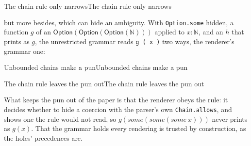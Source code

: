 \documentclass[acmsmall,screen,review,anonymous,nonacm]{acmart}
\begin{document}
\begin{leantheorem}[sum=1xNECGJZ4f]{The chain rule only narrows}{The chain rule only narrows}
\label{thm:The-chain-rule-only-narrows}
\LeanProse{Let $\mathcal{S} \in \texttt{Sorts}$, $G \in \texttt{Grammar}$, $\mathit{ts} \in \mathsf{Array}(\mathit{String})$, $s \in \mathit{String}$, $\mathit{prec} \in \mathbb{N}$, $\mathit{excl} \in \mathsf{Option}(\mathbb{N})$, $\mathit{ch} \in \texttt{Chain}$, $i, j \in \mathbb{N}$, $\mathit{rd} \in \texttt{Reading}$ and $\sigma \in \mathit{String}$. Assume $\mathit{ts}[i, j) \rightsquigarrow^{G}_{\mathcal{S}}(s, \mathit{prec}, \mathit{excl}, \mathit{ch})\ \mathit{rd} : \sigma$. Then $\mathit{ts}[i, j) \rightsquigarrow^{G,\infty}_{\mathcal{S}}(s, \mathit{prec}, \mathit{excl}, \mathit{ch})\ \mathit{rd} : \sigma$.}
\end{leantheorem}

\noindent but more besides, which can hide an ambiguity. With
\texttt{Option.some} hidden, a function $g$ of an
$\mathsf{Option}(\mathsf{Option}(\mathsf{Option}(\mathbb{N})))$ applied
to $x : \mathbb{N}$, and an $h$ that prints as $g$, the unrestricted grammar
reads \texttt{g ( x )} two ways, the renderer's grammar one:

\begin{leantheorem}[sum=zBIW1SK1nz]{Unbounded chains make a pun}{Unbounded chains make a pun}
\label{thm:Unbounded-chains-make-a-pun}
\LeanProse{(1)~$\texttt{g ( x )}[0, 4) \rightsquigarrow^{G_{\mathsf{pun}},\infty}_{\mathcal{S}_{\mathsf{toy}}}(\text{``Prop''}, 0, \mathsf{none}, \mathsf{top}_{G_{\mathsf{pun}}})\ g[x] : \text{``Prop''}$ and (2)~$\texttt{g ( x )}[0, 4) \rightsquigarrow^{G_{\mathsf{pun}},\infty}_{\mathcal{S}_{\mathsf{toy}}}(\text{``Prop''}, 0, \mathsf{none}, \mathsf{top}_{G_{\mathsf{pun}}})\ h[x] : \text{``Prop''}$.}
\end{leantheorem}

\begin{leantheorem}[sum=FEtW4GToJM]{The chain rule leaves the pun out}{The chain rule leaves the pun out}
\label{thm:The-chain-rule-leaves-the-pun-out}
\LeanProse{Let $\sigma \in \mathit{String}$. Then $\neg \texttt{g ( x )}[0, 4) \rightsquigarrow^{G_{\mathsf{pun}}}_{\mathcal{S}_{\mathsf{toy}}}(\text{``Prop''}, 0, \mathsf{none}, \mathsf{top}_{G_{\mathsf{pun}}})\ g[x] : \sigma$.}
\end{leantheorem}

\noindent What keeps the pun out of the paper is that the renderer obeys
the rule: it decides whether to hide a coercion with the parser's own
\texttt{Chain.allows}, and shows one the rule would not read, so
$g(\mathit{some}(\mathit{some}(\mathit{some}\ x)))$ never prints as
$g(x)$. That the grammar holds every rendering is trusted by construction,
as the holes' precedences are.
\end{document}
